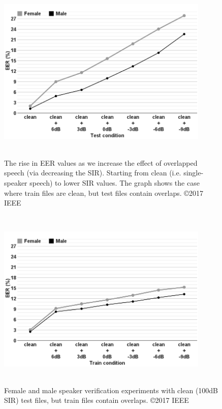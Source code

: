 \begin{figure}[h!]
	\centering
	\includegraphics[height = 3.43in, width=0.9\textwidth]{figures/sidingrid_ovlintest}
	\vspace{-1mm}
	\caption{ The rise in EER values as we increase the effect of overlapped speech (via decreasing the SIR). Starting from clean (i.e. single-speaker speech) to lower SIR values. The graph shows the case where train files are clean, but test files contain overlaps. \copyright 2017 IEEE}
	\label{fig:ch3_sidingrid_ovlintest_train_a}
\end{figure}
\begin{figure}[h!]%
	\centering
	\includegraphics[height = 3.43in, width=0.9\textwidth]{figures/sidingrid_ovlintrain}
	\vspace{-1mm}
	\caption{Female and male speaker verification experiments with clean (100dB SIR) test files, but train files contain overlaps. \copyright 2017 IEEE}
	\label{fig:ch3_sidingrid_ovlintest_train_b}
\end{figure}



